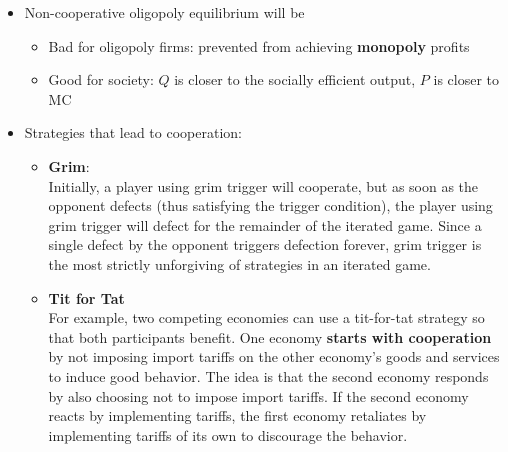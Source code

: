 \documentclass{article}
\begin{document}
\begin{multicols}{2}
\begin{itemize}
\begin{center}
\begin{table}[H]
{\begin{tabular}{cc|cc}
			\end{tabular}}
		\end{table}
	\end{center}
	\item Non-cooperative oligopoly equilibrium will be
	\begin{itemize}
		\item Bad for oligopoly firms: prevented from achieving \textbf{monopoly} profits
		\item Good for society: $Q$ is closer to the socially efficient output, $P$ is closer to MC
	\end{itemize}
    \item Strategies that lead to cooperation:
    \begin{itemize}
    	\item \textbf{Grim}:\\
    	Initially, a player using grim trigger will cooperate, but as soon as the opponent defects (thus satisfying the trigger condition), the player using grim trigger will defect for the remainder of the iterated game. Since a single defect by the opponent triggers defection forever, grim trigger is the most strictly unforgiving of strategies in an iterated game.
    	\item \textbf{Tit for Tat}\\
    	 For example, two competing economies can use a tit-for-tat strategy so that both participants benefit. One economy \textbf{starts with cooperation }by not imposing import tariffs on the other economy's goods and services to induce good behavior. The idea is that the second economy responds by also choosing not to impose import tariffs. If the second economy reacts by implementing tariffs, the first economy retaliates by implementing tariffs of its own to discourage the behavior.
    \end{itemize}
\end{itemize}


\end{multicols}
\end{document}
